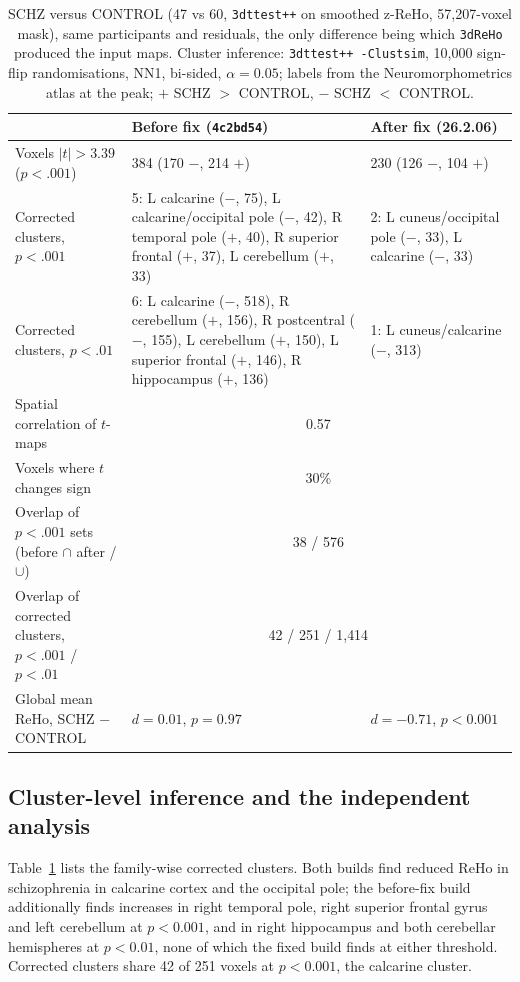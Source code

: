 \documentclass[11pt]{article}
\newcommand{\code}[1]{\texttt{#1}}
\begin{document}
\begin{table}[t]
\centering\small
\caption{SCHZ versus CONTROL (47 vs 60, \code{3dttest++} on smoothed z-ReHo, 57{,}207-voxel mask), same participants and residuals, the only difference being which \code{3dReHo} produced the input maps. Cluster inference: \code{3dttest++ -Clustsim}, 10{,}000 sign-flip randomisations, NN1, bi-sided, $\alpha = 0.05$; labels from the Neuromorphometrics atlas at the peak; $+$ SCHZ $>$ CONTROL, $-$ SCHZ $<$ CONTROL.}
\label{tab:group}
\setlength{\tabcolsep}{4pt}\begin{tabular}{@{}p{4.6cm}p{5.7cm}p{4.6cm}@{}}
\toprule
 & Before fix (\code{4c2bd54}) & After fix (26.2.06) \\
\midrule
Voxels $|t|>3.39$ ($p<.001$) & 384 (170 $-$, 214 $+$) & 230 (126 $-$, 104 $+$) \\
Corrected clusters, $p<.001$ & 5: L calcarine ($-$, 75), L calcarine/occipital pole ($-$, 42), R temporal pole ($+$, 40), R superior frontal ($+$, 37), L cerebellum ($+$, 33) & 2: L cuneus/occipital pole ($-$, 33), L calcarine ($-$, 33) \\
Corrected clusters, $p<.01$ & 6: L calcarine ($-$, 518), R cerebellum ($+$, 156), R postcentral ($-$, 155), L cerebellum ($+$, 150), L superior frontal ($+$, 146), R hippocampus ($+$, 136) & 1: L cuneus/calcarine ($-$, 313) \\
\midrule
Spatial correlation of $t$-maps & \multicolumn{2}{c}{0.57} \\
Voxels where $t$ changes sign & \multicolumn{2}{c}{30\%} \\
Overlap of $p<.001$ sets (before $\cap$ after / $\cup$) & \multicolumn{2}{c}{38 / 576} \\
Overlap of corrected clusters, $p<.001$ / $p<.01$ & \multicolumn{2}{c}{42 / 251 \quad 160 / 1{,}414} \\
Global mean ReHo, SCHZ $-$ CONTROL & $d = 0.01$, $p = 0.97$ & $d = -0.71$, $p < 0.001$ \\
\bottomrule
\end{tabular}
\end{table}

\subsection{Cluster-level inference and the independent analysis}
Table~\ref{tab:group} lists the family-wise corrected clusters. Both builds find reduced ReHo in schizophrenia in calcarine cortex and the occipital pole; the before-fix build additionally finds increases in right temporal pole, right superior frontal gyrus and left cerebellum at $p < 0.001$, and in right hippocampus and both cerebellar hemispheres at $p < 0.01$, none of which the fixed build finds at either threshold. Corrected clusters share 42 of 251 voxels at $p < 0.001$, the calcarine cluster.
\end{document}
